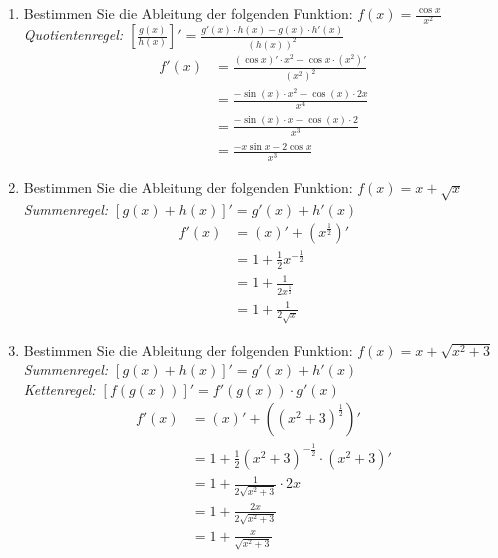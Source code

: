 \documentclass[12pt]{article}
\begin{document}
\begin{enumerate}[start=1,label={\bfseries Frage \arabic*:},leftmargin=1in]
    \item Bestimmen Sie die Ableitung der folgenden Funktion: $f(x)=\frac{\cos{x}}{x^2}$ \\
    \textit{Quotientenregel: $[\frac{g(x)}{h(x)}]' = \frac{g'(x) \cdot h(x) - g(x) \cdot h'(x)}{(h(x))^2}$}
    \begin{align*}
        f'(x)&=\frac{(\cos{x})' \cdot x^2 - \cos{x} \cdot (x^2)'}{(x^2)^2} \\
        &= \frac{-\sin{(x)} \cdot x^2 - \cos{(x)} \cdot 2x}{x^4} \\
        &= \frac{-\sin{(x)} \cdot x - \cos{(x)} \cdot 2}{x^3} \\
        &= \frac{-x\sin{x} - 2\cos{x}}{x^3}
    \end{align*}

    \enlargethispage{-\baselineskip}
    \enlargethispage{-\baselineskip}

    \item Bestimmen Sie die Ableitung der folgenden Funktion: $f(x)=x+\sqrt{x}$ \\
    \textit{Summenregel: $[g(x )+ h(x)]' = g'(x) + h'(x)$} \\
    \begin{align*}
        f'(x)&=(x)' + (x^\frac{1}{2})' \\
        &= 1 + \frac{1}{2} x^{-\frac{1}{2}} \\
        &= 1 + \frac{1}{2x^{\frac{1}{2}}} \\
        &= 1 + \frac{1}{2\sqrt{x}}
    \end{align*}

    \item Bestimmen Sie die Ableitung der folgenden Funktion: $f(x)=x + \sqrt{x^2 + 3}$ \\
    \textit{Summenregel: $[g(x )+ h(x)]' = g'(x) + h'(x)$} \\
    \textit{Kettenregel: $[f(g(x))]'=f'(g(x)) \cdot g'(x)$} \\
    \begin{align*}
        f'(x)&=(x)' + ((x^2 + 3)^\frac{1}{2})' \\
        &= 1 + \frac{1}{2} (x^2 + 3)^{-\frac{1}{2}} \cdot (x^2 + 3)' \\
        &= 1 + \frac{1}{2\sqrt{x^2 + 3}} \cdot 2x \\
        &= 1 + \frac{2x}{2\sqrt{x^2 + 3}} \\
        &= 1 + \frac{x}{\sqrt{x^2 + 3}}
    \end{align*}


\end{enumerate}
\end{document}
